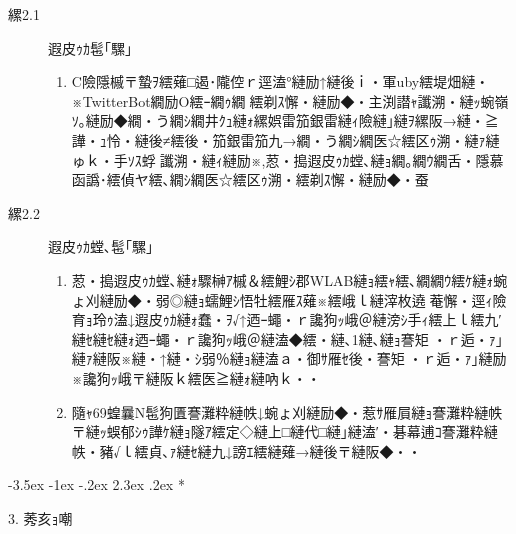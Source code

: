 \documentclass[fleqn, 12pt]{extarticlej}
\makeatletter
\renewcommand\labelenumi{(\theenumi)}
\def\section{\@startsection {section}{1}{\z@}%
{-3.5ex \@plus -1ex \@minus -.2ex}%
{2.3ex \@plus.2ex}%
{\sectionformat}}
\def\sectionformat{\normalsize}
\makeatother
\begin{document}
{\begin{description}
\item[縲2.1] 遐皮ｩｶ髢｢騾｣
  \vspace{-0.8em}
  \begin{enumerate}
    \renewcommand{\labelenumi}{(1-A)}
    \item C險隱槭〒蟄ｦ繧薙□遏･隴倥ｒ逕溘°縺励↑縺後ｉ・軍uby繧堤畑縺・※TwitterBot繝励Ο繧ｰ繝ｩ繝繧剃ｽ懈・縺励◆・主渕譛ｬ讖溯・縺ｯ蜿嶺ｿ｡縺励◆繝・う繝ｼ繝井ｸｭ縺ｫ縲娯雷笳銀雷縺ｨ險縺｣縺ｦ縲阪→縺・≧譁・ｭ怜・縺後≠繧後・笳銀雷笳九→繝・う繝ｼ繝医☆繧区ｩ溯・縺ｧ縺ゅｋ・手ｿｽ蜉讖溯・縺ｨ縺励※,荵・搗遐皮ｩｶ螳､縺ｮ繝｡繝ｳ繝舌・隱慕函譌･繧偵ヤ繧､繝ｼ繝医☆繧区ｩ溯・繧剃ｽ懈・縺励◆・蚕\
    \\

  \end{enumerate}

  \vspace{-0.5em}
  \item[縲2.2] 遐皮ｩｶ螳､髢｢騾｣
    \vspace{-1.0em}
    \begin{enumerate}
      \renewcommand{\labelenumi}{(1)}
    \item 荵・搗遐皮ｩｶ螳､縺ｫ驟榊ｱ槭＆繧鯉ｼ郡WLAB縺ｮ繧ｬ繧､繝繝ｳ繧ｹ縺ｫ蜿ょ刈縺励◆・弱◎縺ｮ蠕鯉ｼ悟牡繧雁ｽ薙※繧峨ｌ縺滓枚遶菴懈・逕ｨ險育ｮ玲ｩ溘↓遐皮ｩｶ縺ｫ蠢・ｦ√↑迺ｰ蠅・ｒ讒狗ｯ峨＠縺滂ｼ手ｨ繧上ｌ繧九′縺ｾ縺ｾ縺ｫ迺ｰ蠅・ｒ讒狗ｯ峨＠縺溘◆繧・縺､1縺､縺ｮ謇矩・ｒ逅・ｧ｣縺ｧ縺阪※縺・↑縺・ｼ弱％縺ｮ縺溘ａ・御ｻ雁ｾ後・謇矩・ｒ逅・ｧ｣縺励※讒狗ｯ峨〒縺阪ｋ繧医≧縺ｫ縺吶ｋ・・
      \renewcommand{\labelenumi}{(7)}
    \item 隨ｬ69蝗曩N髢狗匱謇灘粋縺帙↓蜿ょ刈縺励◆・惹ｻ雁屓縺ｮ謇灘粋縺帙〒縺ｯ蜈郁ｼｩ譁ｹ縺ｮ隧ｱ繧定◇縺上□縺代□縺｣縺溘′・碁幕逋ｺ謇灘粋縺帙・豬√ｌ繧貞､ｧ縺ｾ縺九↓謗ｴ繧縺薙→縺後〒縺阪◆・・
    \end{enumerate}

\end{description}

\vspace{-1.5em}
\section*{3. 莠亥ｮ嘲
\vspace{-0.8em}

}}
\end{document}
